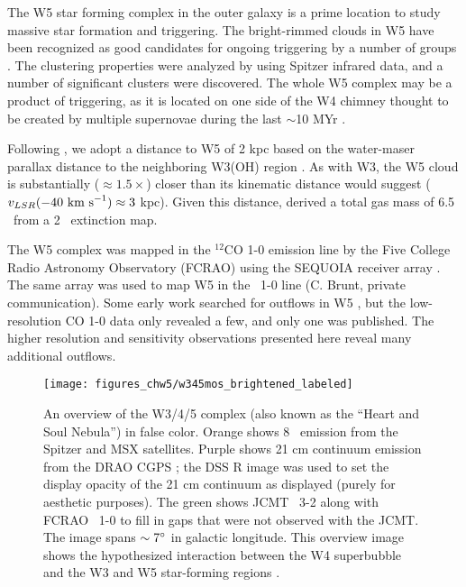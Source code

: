 
The W5 star forming complex in the outer galaxy is a prime location to study
massive star formation and triggering.  The bright-rimmed clouds in W5 have
been recognized as good candidates for ongoing triggering by a number of groups
\citep{lefloch:cometary:1997,thompson:searching:2004,karr:triggered:2003}.  The
clustering properties were analyzed by \citet{koenig:clustered:2008} using
Spitzer infrared data, and a number of significant clusters were discovered.
The whole W5 complex may be a product of triggering, as it is located on one
side of the W4 chimney thought to be created by multiple supernovae during the
last $\sim$10 MYr \citep[][Figure \ref{fig:color_overview}]
{oey:hierarchical:2005}.  

Following \citet{koenig:clustered:2008}, we adopt a distance to W5 of 2 kpc
based on the water-maser parallax distance to the neighboring W3(OH) region
\citep{Hachisuka2006}.  As with W3, the W5 cloud is substantially
($\approx1.5\times$) closer than its kinematic distance would suggest
($v_{LSR}(-40~\textrm{km~s}^{-1})\approx3$ kpc).  Given this distance,
\citet{koenig:clustered:2008} derived a total gas mass of 6.5 \msun\ from
a 2 \um\ extinction map.

The W5 complex was mapped in the $^{12}$CO 1-0 emission line by the Five
College Radio Astronomy Observatory (FCRAO) using the SEQUOIA receiver array
\citep{heyer:ogs:1998}.  The same array was used to map W5 in the \thirteenco\
1-0 line (C. Brunt, private communication).  Some early work searched for
outflows in W5 \citep{bretherton:unbiased:2002}, but the low-resolution CO 1-0
data only revealed a few, and only one was published.  The higher resolution
and sensitivity observations presented here reveal many additional outflows.

\begin{figure*}
  \texttt{[image: figures\_chw5/w345mos\_brightened\_labeled]}
  \caption{An overview of the W3/4/5 complex (also known as the ``Heart and
  Soul Nebula'') in false color. Orange shows 8 \um\ emission from the Spitzer
  and MSX satellites.  Purple shows 21 cm continuum emission from the DRAO CGPS
  \citep{Taylor2003:CGPS}; the DSS R image was used to set the display opacity
  of the 21 cm continuum as displayed (purely for aesthetic purposes).  The
  green shows JCMT \twelveco\ 3-2 along with FCRAO \twelveco\ 1-0 to fill in 
  gaps that were not observed with the JCMT.  The image spans
  $\sim7\mbox{$^\circ$}$ in galactic longitude.  This overview image shows the
  hypothesized interaction between the W4 superbubble and the W3 and W5
  star-forming regions \citep{oey:hierarchical:2005}.}
  \label{fig:color_overview}
\end{figure*}

